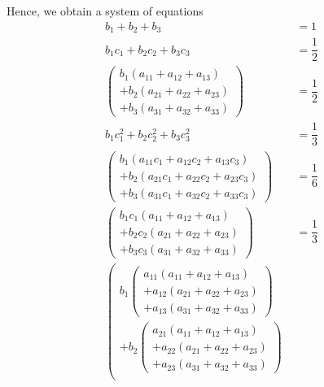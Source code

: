 \documentclass[a4paper,oneside]{book}
\numberwithin{equation}{chapter}
\begin{document}
Hence, we obtain a system of equations
\begin{align}
{b_1} + {b_2} + {b_3} &= 1\\
{b_1}{c_1} + {b_2}{c_2} + {b_3}{c_3} &= \dfrac{1}{2}\\
\left( \begin{array}{l}
{b_1}\left( {{a_{11}} + {a_{12}} + {a_{13}}} \right)\\
 + {b_2}\left( {{a_{21}} + {a_{22}} + {a_{23}}} \right)\\
 + {b_3}\left( {{a_{31}} + {a_{32}} + {a_{33}}} \right)
\end{array} \right) &= \dfrac{1}{2}\\
{b_1}c_1^2 + {b_2}c_2^2 + {b_3}c_3^2 &= \dfrac{1}{3}\\
\left( \begin{array}{l}
{b_1}\left( {{a_{11}}{c_1} + {a_{12}}{c_2} + {a_{13}}{c_3}} \right)\\
 + {b_2}\left( {{a_{21}}{c_1} + {a_{22}}{c_2} + {a_{23}}{c_3}} \right)\\
 + {b_3}\left( {{a_{31}}{c_1} + {a_{32}}{c_2} + {a_{33}}{c_3}} \right)
\end{array} \right) &= \dfrac{1}{6}\\
\left( \begin{array}{l}
{b_1}{c_1}\left( {{a_{11}} + {a_{12}} + {a_{13}}} \right)\\
 + {b_2}{c_2}\left( {{a_{21}} + {a_{22}} + {a_{23}}} \right)\\
 + {b_3}{c_3}\left( {{a_{31}} + {a_{32}} + {a_{33}}} \right)
\end{array} \right) &= \dfrac{1}{3}\\
\left( \begin{array}{l}
{b_1}\left( \begin{array}{l}
{a_{11}}\left( {{a_{11}} + {a_{12}} + {a_{13}}} \right)\\
 + {a_{12}}\left( {{a_{21}} + {a_{22}} + {a_{23}}} \right)\\
 + {a_{13}}\left( {{a_{31}} + {a_{32}} + {a_{33}}} \right)
\end{array} \right)\\
 + {b_2}\left( \begin{array}{l}
{a_{21}}\left( {{a_{11}} + {a_{12}} + {a_{13}}} \right)\\
 + {a_{22}}\left( {{a_{21}} + {a_{22}} + {a_{23}}} \right)\\
 + {a_{23}}\left( {{a_{31}} + {a_{32}} + {a_{33}}} \right)
\end{array} \right)\\

\end{array}
\end{align}
\end{document}
